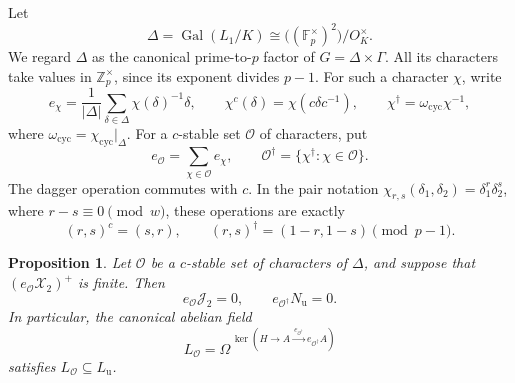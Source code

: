 \documentclass[11pt]{article}
\newtheorem{proposition}[theorem]{Proposition}
\theoremstyle{definition}\newtheorem{definition}[theorem]{Definition}
\begin{document}
Let
\[
 \Delta=\operatorname{Gal}(L_1/K)
       \cong\bigl((\mathbb F_p^\times)^2\bigr)/O_K^\times .
\]
We regard \(\Delta\) as the canonical prime-to-\(p\) factor of
\(G=\Delta\times\Gamma\).
All its characters take values in \(\mathbb Z_p^\times\), since
its exponent divides \(p-1\).
For such a character \(\chi\), write
\[
 e_\chi=\frac1{|\Delta|}
             \sum_{\delta\in\Delta}\chi(\delta)^{-1}\delta,
 \qquad
 \chi^c(\delta)=\chi(c\delta c^{-1}),\qquad
 \chi^\dagger=\omega_{\mathrm{cyc}}\chi^{-1},
\]
where \(\omega_{\mathrm{cyc}}=\chi_{\mathrm{cyc}}|_\Delta\).
For a \(c\)-stable set \(\mathcal O\) of characters, put
\[
 e_{\mathcal O}=\sum_{\chi\in\mathcal O}e_\chi,\qquad
 \mathcal O^\dagger=\{\chi^\dagger:\chi\in\mathcal O\}.
\]
The dagger operation commutes with \(c\).
In the pair notation
\(\chi_{r,s}(\delta_1,\delta_2)=\delta_1^r\delta_2^s\),
where \(r-s\equiv0\pmod w\), these operations are exactly
\[
                  (r,s)^c=(s,r),\qquad
                  (r,s)^\dagger=(1-r,1-s)
                                \pmod{p-1}.
\]

\begin{proposition}\label{prop:cm-component-unit-detection}
Let \(\mathcal O\) be a \(c\)-stable set of characters of
\(\Delta\), and suppose that
\((e_{\mathcal O}\mathcal X_2)^+\) is finite.
Then
\[
 e_{\mathcal O}\mathcal J_2=0,\qquad
 e_{\mathcal O^\dagger}N_{\mathrm u}=0.
\]
In particular, the canonical abelian field
\[
 L_{\mathcal O}
   =\Omega^{\,\ker(H\longrightarrow A
                       \xrightarrow{\,e_{\mathcal O^\dagger}\,}
                                e_{\mathcal O^\dagger}A)}
\]
satisfies \(L_{\mathcal O}\subseteq L_{\mathrm u}\).
\end{proposition}
\end{document}
